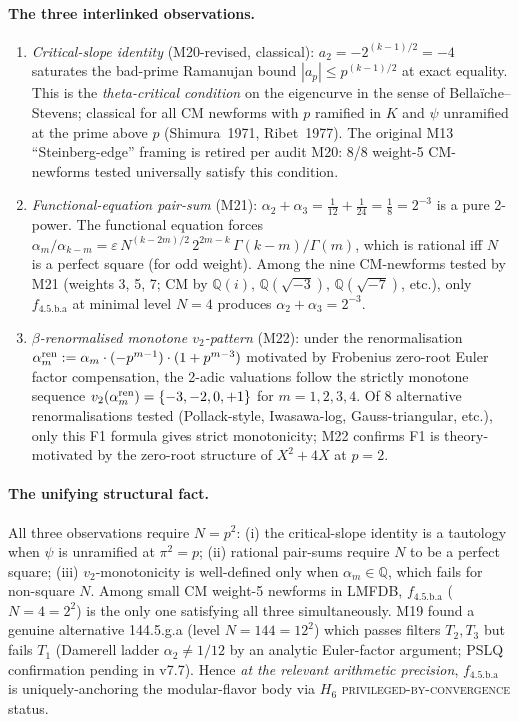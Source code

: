 \documentclass[a4paper,11pt]{article}
\newcommand{\fLM}{f_{\text{4.5.b.a}}}
\newcommand{\Qi}{\mathbb{Q}(i)}
\theoremstyle{definition}
\theoremstyle{remark}
\begin{document}
\paragraph{The three interlinked observations.}
\begin{enumerate}
\item \emph{Critical-slope identity} (M20-revised, classical):
$a_{2}=-2^{(k-1)/2}=-4$ saturates the bad-prime Ramanujan bound
$|a_{p}|\leq p^{(k-1)/2}$ at exact equality.  This is the
\emph{theta-critical condition} on the eigencurve in the sense of
Bellaïche--Stevens; classical for all CM newforms with $p$ ramified
in $K$ and $\psi$ unramified at the prime above $p$
(Shimura~1971, Ribet~1977).  The original M13 ``Steinberg-edge''
framing is retired per audit M20: 8/8 weight-5 CM-newforms tested
universally satisfy this condition.

\item \emph{Functional-equation pair-sum} (M21):
$\alpha_{2}+\alpha_{3}=\tfrac{1}{12}+\tfrac{1}{24}=\tfrac{1}{8}=2^{-3}$
is a pure 2-power.  The functional equation forces
$\alpha_{m}/\alpha_{k-m}=\varepsilon\,N^{(k-2m)/2}\,2^{2m-k}\,
\Gamma(k-m)/\Gamma(m)$, which is rational iff $N$ is a perfect
square (for odd weight).  Among the nine CM-newforms tested by M21
(weights 3, 5, 7; CM by $\Qi,\,\mathbb{Q}(\sqrt{-3}),\,\mathbb{Q}(\sqrt{-7})$, etc.),
only $\fLM$ at minimal level $N=4$ produces $\alpha_{2}+\alpha_{3}=2^{-3}$.

\item \emph{$\beta$-renormalised monotone $v_{2}$-pattern} (M22):
under the renormalisation $\alpha_{m}^{\rm ren}:=\alpha_{m}\cdot
(-p^{m-1})\cdot(1+p^{m-3})$ motivated by Frobenius zero-root Euler
factor compensation, the 2-adic valuations follow the strictly
monotone sequence $v_{2}(\alpha_{m}^{\rm ren})=\{-3,-2,0,+1\}$ for
$m=1,2,3,4$.  Of 8 alternative renormalisations tested (Pollack-style,
Iwasawa-log, Gauss-triangular, etc.), only this F1 formula gives
strict monotonicity; M22 confirms F1 is theory-motivated by the
zero-root structure of $X^{2}+4X$ at $p=2$.
\end{enumerate}

\paragraph{The unifying structural fact.}
All three observations require $N=p^{2}$:
(i) the critical-slope identity is a tautology when $\psi$ is
unramified at $\pi^{2}=p$;
(ii) rational pair-sums require $N$ to be a perfect square;
(iii) $v_{2}$-monotonicity is well-defined only when $\alpha_{m}\in\mathbb{Q}$,
which fails for non-square $N$.
Among small CM weight-5 newforms in LMFDB, $\fLM$ ($N=4=2^{2}$) is
the only one satisfying all three simultaneously.  M19 found a
genuine alternative 144.5.g.a (level $N=144=12^{2}$) which passes
filters $T_{2}, T_{3}$ but fails $T_{1}$ (Damerell ladder $\alpha_{2}\ne 1/12$
by an analytic Euler-factor argument; PSLQ confirmation pending in
v7.7).  Hence \emph{at the relevant arithmetic precision},
$\fLM$ is uniquely-anchoring the modular-flavor body via $H_{6}$
\textsc{privileged-by-convergence} status.
\end{document}
